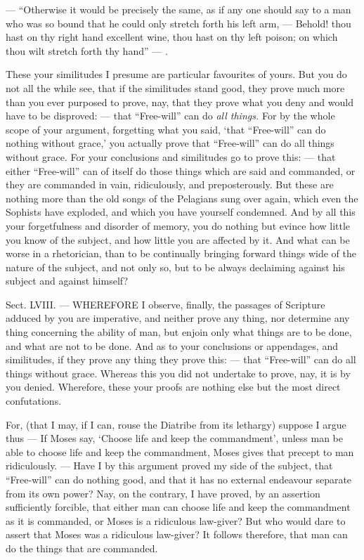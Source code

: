 — “Otherwise it would be precisely the same, as if any one should say to a man who was so bound that he could only stretch forth his left arm, — Behold! thou hast on thy right hand excellent wine, thou hast on thy left poison; on which thou wilt stretch forth thy hand” — .

These your similitudes I presume are particular favourites of yours. But you do not all the while see, that if the similitudes stand good, they prove much more than you ever purposed to prove, nay, that they prove what you deny and would have to be disproved: — that “Free-will” can do \emph{all things. }For by the whole scope of your argument, forgetting what you said, ‘that “Free-will” can do nothing without grace,’ you actually prove that “Free-will” can do all things without grace. For your conclusions and similitudes go to prove this: — that either “Free-will” can of itself do those things which are said and commanded, or they are commanded in vain, ridiculously, and preposterously. But these are nothing more than the old songs of the Pelagians sung over again, which even the Sophists have exploded, and which you have yourself condemned. And by all this your forgetfulness and disorder of memory, you do nothing but evince how little you know of the subject, and how little you are affected by it. And what can be worse in a rhetorician, than to be continually bringing forward things wide of the nature of the subject, and not only so, but to be always declaiming against his subject and against himself?


Sect. LVIII. — WHEREFORE I observe, finally, the passages of Scripture adduced by you are imperative, and neither prove any thing, nor determine any thing concerning the ability of man, but enjoin only what things are to be done, and what are not to be done. And as to your conclusions or appendages, and similitudes, if they prove any thing they prove this: — that “Free-will” can do all things without grace. Whereas this you did not undertake to prove, nay, it is by you denied. Wherefore, these your proofs are nothing else but the most direct confutations.

For, (that I may, if I can, rouse the Diatribe from its lethargy) suppose I argue thus — If Moses say, ‘Choose life and keep the commandment’, unless man be able to choose life and keep the commandment, Moses gives that precept to man ridiculously. — Have I by this argument proved my side of the subject, that “Free-will” can do nothing good, and that it has no external endeavour separate from its own power? Nay, on the contrary, I have proved, by an assertion sufficiently forcible, that either man can choose life and keep the commandment as it is commanded, or Moses is a ridiculous law-giver? But who would dare to assert that Moses was a ridiculous law-giver? It follows therefore, that man can do the things that are commanded.

